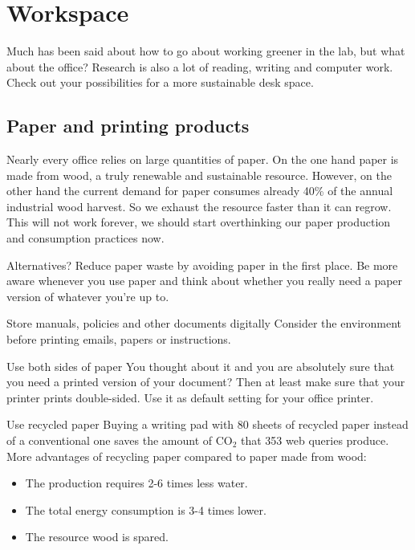 \section{Workspace}

 Much has been said about how to go about working greener in the lab, but what about the office? Research is also a lot of reading, writing and computer work. Check out your possibilities for a more sustainable desk space. 
 
\subsection{Paper and printing products}
	
	Nearly every office relies on large quantities of paper. On the one hand paper is made from wood, a truly renewable and sustainable resource. However, on the other hand the current demand for paper consumes already 40\% of the annual industrial wood harvest. So we exhaust the resource faster than it can regrow.  \cite{WWF} This will not work forever, we should start overthinking our paper production and consumption practices now. 

\begin{suggest}{Alternatives?}
	Reduce paper waste by avoiding paper in the first place. 
	Be more aware whenever you use paper and think about whether you really need a paper version of whatever you're up to.
\end{suggest}

\begin{suggest}{Store manuals, policies and other documents digitally}
		 Consider the environment before printing emails, papers or instructions. 
\end{suggest}

\begin{suggest}{Use both sides of paper}
	You thought about it and you are absolutely sure that you need a printed version of your document? Then at least make sure that your printer prints double-sided. Use it as default setting for your office printer.
\end{suggest}

\begin{suggest}{Use recycled paper}
	Buying a writing pad with 80 sheets of recycled paper instead of a conventional one 
	saves the amount of CO$_2$ that 353 web queries produce.
	More advantages of recycling paper compared to paper made from wood:  
	\begin{itemize}
		\item  The production requires 2-6 times less water.
		\item  The total energy consumption is 3-4 times lower. 
		\item  The resource wood is spared. \cite{Paper}
	\end{itemize}  
\end{suggest}
	
